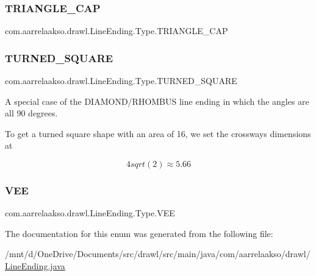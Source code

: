 \subsubsection{\texorpdfstring{T\+R\+I\+A\+N\+G\+L\+E\+\_\+\+C\+AP}{TRIANGLE\_CAP}}
{\footnotesize\ttfamily com.\+aarrelaakso.\+drawl.\+Line\+Ending.\+Type.\+T\+R\+I\+A\+N\+G\+L\+E\+\_\+\+C\+AP}

\mbox{\label{enumcom_1_1aarrelaakso_1_1drawl_1_1_line_ending_1_1_type_ae2bef871a847ab802cf25e83853a3372}} 
\subsubsection{\texorpdfstring{T\+U\+R\+N\+E\+D\+\_\+\+S\+Q\+U\+A\+RE}{TURNED\_SQUARE}}
{\footnotesize\ttfamily com.\+aarrelaakso.\+drawl.\+Line\+Ending.\+Type.\+T\+U\+R\+N\+E\+D\+\_\+\+S\+Q\+U\+A\+RE}

A special case of the D\+I\+A\+M\+O\+N\+D/\+R\+H\+O\+M\+B\+US line ending in which the angles are all 90 degrees.

To get a turned square shape with an area of 16, we set the crossways dimensions at

\[4 sqrt(2) \approx 5.66\] \mbox{\label{enumcom_1_1aarrelaakso_1_1drawl_1_1_line_ending_1_1_type_a19cae46d0b7da7cea3da79f650474a98}} 
\subsubsection{\texorpdfstring{V\+EE}{VEE}}
{\footnotesize\ttfamily com.\+aarrelaakso.\+drawl.\+Line\+Ending.\+Type.\+V\+EE}



The documentation for this enum was generated from the following file\+:\begin{DoxyCompactItemize}
\item 
/mnt/d/\+One\+Drive/\+Documents/src/drawl/src/main/java/com/aarrelaakso/drawl/\hyperlink{_line_ending_8java}{Line\+Ending.\+java}\end{DoxyCompactItemize}

